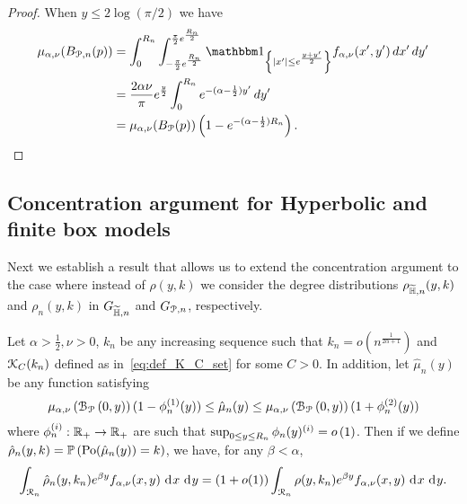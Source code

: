 \begin{proof}
When $y \le 2 \log(\pi/2)$ we have
\begin{align*}
	\mu_{\alpha,\nu}(B_{\Pcal,n}(p))
	&= \int_0^{R_n} \int_{-\frac{\pi}{2}e^{\frac{R_n}{2}}}^{\frac{\pi}{2}e^{\frac{R_n}{2}}} 
		\ind{|x^\prime| \le e^{\frac{y+y^\prime}{2}}} f_{\alpha,\nu}(x^\prime,y^\prime) \, dx^\prime \, dy^\prime\\
	&= \frac{2 \alpha \nu}{\pi} e^{\frac{y}{2}} \int_0^{R_n} e^{-(\alpha - \frac{1}{2})y^\prime} \, dy^\prime\\
	&= \mu_{\alpha,\nu}(B_\Pcal(p))\left(1 - e^{-(\alpha - \frac{1}{2})R_n}\right).
\end{align*}
\end{proof}

\subsection{Concentration argument for Hyperbolic and finite box models}

Next we establish a result that allows us to extend the concentration argument to the case where instead of $\rho(y,k)$ we consider the degree distributions $\rho_{\widetilde{\mathbb{H}},n}(y,k)$ and $\rho_{n}(y,k)$ in $G_{\widetilde{\mathbb{H}},n}$ and $G_{{\mathcal P},n}$, respectively.

\begin{lemma}\label{lem:concentration_argument_rho_approximation}
Let $\alpha > \frac{1}{2}, \nu > 0$, $k_n$ be any increasing sequence such that $k_n = o(n^{\frac{1}{2\alpha + 1}})$ and ${\mathcal K}_{C}(k_n)$ defined as in~\eqref{eq:def_K_C_set} for some $C > 0$. In addition, let $\hat{\mu}_n(y)$ be any function satisfying 
\[
	\mu_{\alpha,\nu}\left({\mathcal B}_{{\mathcal P}}\left(0,y\right)\right)(1 - \phi_n^{(1)}(y)) \le \hat{\mu}_n(y) \le \mu_{\alpha,\nu}\left({\mathcal B}_{{\mathcal P}}\left(0,y\right)\right)(1 + \phi_n^{(2)}(y))
\]
where $\phi_n^{(i)} : {\mathbb R}_+ \to {\ensuremath{\mathbb R}}_+$ are such that $\sup_{0 \le y \le R_n} \phi_n(y)^{(i)} = o\left(1\right)$. Then if we define $\hat{\rho}_n(y,k) = \mathbb{P}\left({\mathrm{Po}}(\hat{\mu}_n(y)) = k\right)$, we have, for any $\beta < \alpha$,
\[
	\int_{{\mathcal R}_n} \hat{\rho}_n(y,k_n) e^{\beta y} f_{\alpha,\nu}(x,y) \operatorname{\, \mathrm{d}\hspace{-1pt}} x \operatorname{\, \mathrm{d}\hspace{-1pt}} y 
	= (1 + o(1)) \int_{{\mathcal R}_n} \rho(y,k_n) e^{\beta y} f_{\alpha,\nu}(x,y) \operatorname{\, \mathrm{d}\hspace{-1pt}} x \operatorname{\, \mathrm{d}\hspace{-1pt}} y.
\]
\end{lemma}

